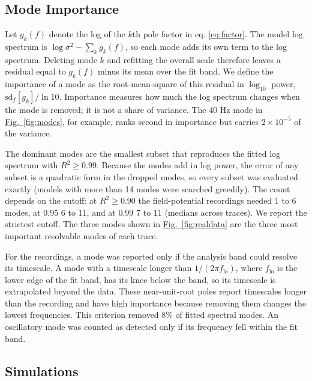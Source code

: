 \documentclass[pdflatex,lineno,sn-nature]{sn-jnl}
\newcommand{\figpanel}[3][]{\hyperref[#2]{Fig.~#1\ref*{#2}#3}}
\theoremstyle{thmstyleone}
\theoremstyle{thmstyletwo}
\theoremstyle{thmstylethree}
\begin{document}
\subsection{Mode Importance}

Let $g_k(f)$ denote the log of the $k$th pole factor in eq. \ref{eq:factor}. The model log spectrum is $\log \sigma^2 - \sum_k g_k(f)$, so each mode adds its own term to the log spectrum. Deleting mode $k$ and refitting the overall scale therefore leaves a residual equal to $g_k(f)$ minus its mean over the fit band. We define the importance of a mode as the root-mean-square of this residual in $\log_{10}$ power, $\mathrm{sd}_f[g_k]/\ln 10$. Importance measures how much the log spectrum changes when the mode is removed; it is not a share of variance. The 40 Hz mode in \figpanel{fig:modes}{}, for example, ranks second in importance but carries $2 \times 10^{-5}$ of the variance.

The dominant modes are the smallest subset that reproduces the fitted log spectrum with $R^2 \ge 0.99$. Because the modes add in log power, the error of any subset is a quadratic form in the dropped modes, so every subset was evaluated exactly (models with more than 14 modes were searched greedily). The count depends on the cutoff: at $R^2 \ge 0.90$ the field-potential recordings needed 1 to 6 modes, at $0.95$ 6 to 11, and at $0.99$ 7 to 11 (medians across traces). We report the strictest cutoff. The three modes shown in \figpanel{fig:realdata}{} are the three most important resolvable modes of each trace.

For the recordings, a mode was reported only if the analysis band could resolve its timescale. A mode with a timescale longer than $1/(2\pi f_{\mathrm{lo}})$, where $f_{\mathrm{lo}}$ is the lower edge of the fit band, has its knee below the band, so its timescale is extrapolated beyond the data. These near-unit-root poles report timescales longer than the recording and have high importance because removing them changes the lowest frequencies. This criterion removed 8\% of fitted spectral modes. An oscillatory mode was counted as detected only if its frequency fell within the fit band.

\subsection{Simulations}
\end{document}
